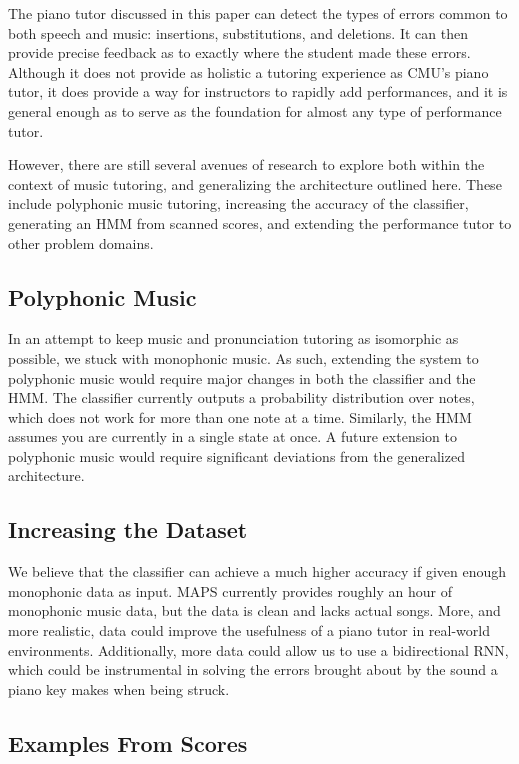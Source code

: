 \documentclass[twocolumn]{article}
\begin{document}
The piano tutor discussed in this paper can detect the types of errors common to both speech and music: insertions, substitutions, and deletions. It can then provide precise feedback as to exactly where the student made these errors. Although it does not provide as holistic a tutoring experience as CMU’s piano tutor, it does provide a way for instructors to rapidly add performances, and it is general enough as to serve as the foundation for almost any type of performance tutor.

However, there are still several avenues of research to explore both within the context of music tutoring, and generalizing the architecture outlined here. These include polyphonic music tutoring, increasing the accuracy of the classifier, generating an HMM from scanned scores, and extending the performance tutor to other problem domains.

\subsection{Polyphonic Music}

In an attempt to keep music and pronunciation tutoring as isomorphic as possible, we stuck with monophonic music. As such, extending the system to polyphonic music would require major changes in both the classifier and the HMM. The classifier currently outputs a probability distribution over notes, which does not work for more than one note at a time. Similarly, the HMM assumes you are currently in a single state at once. A future extension to polyphonic music would require significant deviations from the generalized architecture.

\subsection{Increasing the Dataset}

We believe that the classifier can achieve a much higher accuracy if given enough monophonic data as input. MAPS currently provides roughly an hour of monophonic music data, but the data is clean and lacks actual songs. More, and more realistic, data could improve the usefulness of a piano tutor in real-world environments. Additionally, more data could allow us to use a bidirectional RNN, which could be instrumental in solving the errors brought about by the sound a piano key makes when being struck.

\subsection{Examples From Scores}
\end{document}
